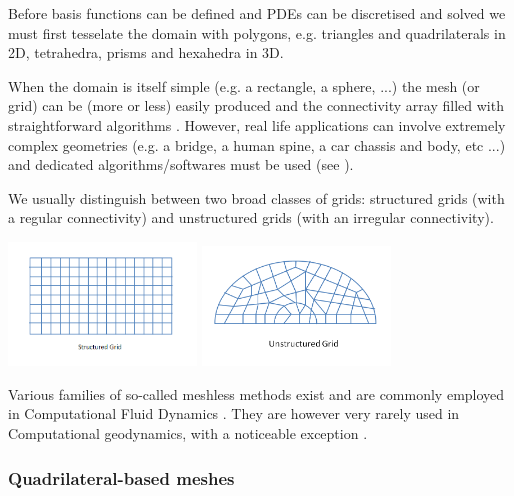 
Before basis functions can be defined and PDEs can be discretised and solved 
we must first tesselate the domain with polygons, e.g. triangles and 
quadrilaterals in 2D, tetrahedra, prisms and hexahedra in 3D.  

When the domain is itself simple (e.g. a rectangle, a sphere, ...) the mesh (or grid) can 
be (more or less) easily produced and the connectivity array filled with straightforward 
algorithms \cite{thie18}.
However, real life applications can involve extremely complex geometries (e.g. a bridge, 
a human spine, a car chassis and body, etc ...) and dedicated algorithms/softwares 
must be used (see \cite{thsw,frge,xiyz09}). 

We usually distinguish between two broad classes of grids: structured grids (with a regular 
connectivity) and unstructured grids (with an irregular connectivity).
 

\begin{center}
\includegraphics[width=5cm]{images/meshes/structured_grid}
\includegraphics[width=5cm]{images/meshes/unstructured_grid}
\end{center}

\begin{remark}
Various families of so-called meshless methods exist and are commonly employed in Computational 
Fluid Dynamics \cite{liugu,liliu,grliu,liuliu}. They are however very rarely used in 
Computational geodynamics, with a noticeable exception \cite{hans03}.
\end{remark}

\subsubsection{Quadrilateral-based meshes}

